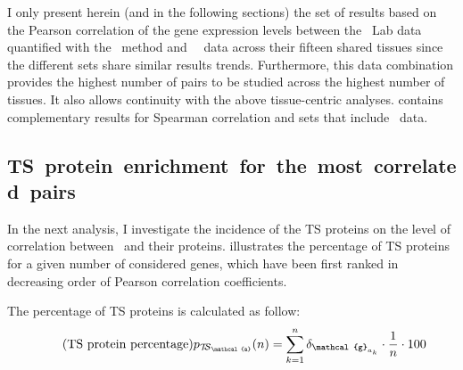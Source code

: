 I only present herein (and in the following sections)
the set of results based on the Pearson correlation of the gene expression levels
between the \pandey\ Lab data quantified with the \PPKM\ method
and \uhlen\ \etal\ data across their fifteen shared tissues
since the different sets share similar results trends.
Furthermore, this data combination provides the highest number of pairs
to be studied across the highest number of tissues.
It also allows continuity with the above tissue-centric analyses.
 contains complementary results
for Spearman correlation and sets that include \gtex\ data.\mybr\

\subsection{TS~protein~enrichment~for~the~most~correlated~pairs}
\vspace{-5mm}
In the next analysis,
I investigate the incidence of the \gls{TS} proteins
on the level of correlation between \mRNAs\ and their proteins.
 illustrates the percentage of \gls{TS} proteins
for a given number of considered genes,
which have been first ranked
in decreasing order of Pearson correlation coefficients.\mybr\

The percentage of \gls{TS} proteins is calculated as follow:
\begin{equation}
    \tag{TS protein percentage}
    p_{\TSm_{\mathcal{a}}}(n) =%
    \displaystyle\sum_{k=1}^{n}\delta_{\mathcal{g}_{a_{k}}}\cdot\frac{1}{n}\cdot100
\end{equation}

